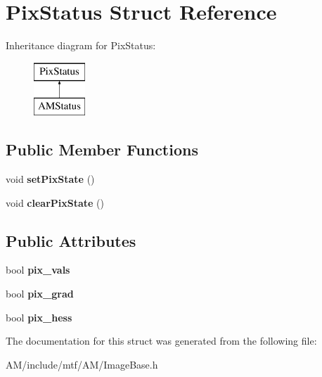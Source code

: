 \hypertarget{structPixStatus}{\section{Pix\-Status Struct Reference}
\label{structPixStatus}
}
Inheritance diagram for Pix\-Status\-:\begin{figure}[H]
\begin{center}
\leavevmode
\includegraphics[height=2.000000cm]{structPixStatus}
\end{center}
\end{figure}
\subsection*{Public Member Functions}
\begin{DoxyCompactItemize}
\item 
\hypertarget{structPixStatus_af1cb36166d90f855669107c3f659518b}{void {\bfseries set\-Pix\-State} ()}\label{structPixStatus_af1cb36166d90f855669107c3f659518b}

\item 
\hypertarget{structPixStatus_a1490e07d90b5516115eff86c1f11e155}{void {\bfseries clear\-Pix\-State} ()}\label{structPixStatus_a1490e07d90b5516115eff86c1f11e155}

\end{DoxyCompactItemize}
\subsection*{Public Attributes}
\begin{DoxyCompactItemize}
\item 
\hypertarget{structPixStatus_a1dd695848d1cce38d418a587398a0ce9}{bool {\bfseries pix\-\_\-vals}}\label{structPixStatus_a1dd695848d1cce38d418a587398a0ce9}

\item 
\hypertarget{structPixStatus_a0841511b13e380db1f33f83c8159e7f9}{bool {\bfseries pix\-\_\-grad}}\label{structPixStatus_a0841511b13e380db1f33f83c8159e7f9}

\item 
\hypertarget{structPixStatus_a3d1809c7b519a8331ddfda36d81d25d1}{bool {\bfseries pix\-\_\-hess}}\label{structPixStatus_a3d1809c7b519a8331ddfda36d81d25d1}

\end{DoxyCompactItemize}


The documentation for this struct was generated from the following file\-:\begin{DoxyCompactItemize}
\item 
A\-M/include/mtf/\-A\-M/Image\-Base.\-h\end{DoxyCompactItemize}
